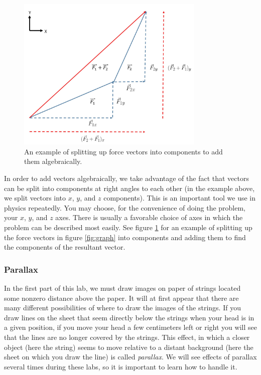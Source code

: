 \begin{figure}[h]
    \begin{center}
        \includegraphics[width=0.8\textwidth, height=0.6\textwidth]{./Exp3/pic/image12.jpg}
    \end{center}
    \caption{An example of splitting up force vectors into components to add them algebraically.}
    \label{fig:add}
\end{figure}

In order to add vectors algebraically, we take advantage of the fact that vectors can be split into components at right angles to each other (in the example above, we split vectors into $x$, $y$, and $z$ components). This is an important tool we use in physics repeatedly. You may choose, for the convenience of doing the problem, your $x$, $y$, and $z$ axes. There is usually a favorable choice of axes in which the problem can be described most easily. See figure \ref{fig:add} for an example of splitting up the force vectors in figure \ref{fig:graph} into components and adding them to find the components of the resultant vector.

\subsubsection{Parallax}

In the first part of this lab, we must draw images on paper of strings located some nonzero distance above the paper. It will at first appear that there are many different possibilities of where to draw the images of the strings. If you draw lines on the sheet that seem directly below the strings when your head is in a given position, if you move your head a few centimeters left or right you will see that the lines are no longer covered by the strings. This effect, in which a closer object (here the string) seems to move relative to a distant background (here the sheet on which you draw the line) is called \emph{parallax}. We will see effects of parallax several times during these labs, so it is important to learn how to handle it. \myskip

